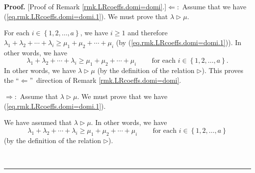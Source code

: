 \documentclass[numbers=enddot,12pt,final,onecolumn,notitlepage]{scrartcl}%
\theoremstyle{definition}
\newenvironment{proof}[1][Proof]{\noindent\textbf{#1.} }{\ \rule{0.5em}{0.5em}}
\begin{document}
\begin{proof}
[Proof of Remark \ref{rmk.LRcoeffs.domi=domi}.]$\Longleftarrow:$ Assume that
we have (\ref{eq.rmk.LRcoeffs.domi=domi.1}). We must prove that $\lambda
\triangleright\mu$.

For each $i\in\left\{  1,2,\ldots,a\right\}  $, we have $i\geq1$ and therefore
$\lambda_{1}+\lambda_{2}+\cdots+\lambda_{i}\geq\mu_{1}+\mu_{2}+\cdots+\mu_{i}$
(by (\ref{eq.rmk.LRcoeffs.domi=domi.1})). In other words, we have%
\[
\lambda_{1}+\lambda_{2}+\cdots+\lambda_{i}\geq\mu_{1}+\mu_{2}+\cdots+\mu
_{i}\ \ \ \ \ \ \ \ \ \ \text{for each }i\in\left\{  1,2,\ldots,a\right\}  .
\]
In other words, we have $\lambda\triangleright\mu$ (by the definition of the
relation $\triangleright$). This proves the \textquotedblleft$\Longleftarrow
$\textquotedblright\ direction of Remark \ref{rmk.LRcoeffs.domi=domi}.

$\Longrightarrow:$ Assume that $\lambda\triangleright\mu$. We must prove that
we have (\ref{eq.rmk.LRcoeffs.domi=domi.1}).

We have assumed that $\lambda\triangleright\mu$. In other words, we have%
\begin{equation}
\lambda_{1}+\lambda_{2}+\cdots+\lambda_{i}\geq\mu_{1}+\mu_{2}+\cdots+\mu
_{i}\ \ \ \ \ \ \ \ \ \ \text{for each }i\in\left\{  1,2,\ldots,a\right\}
\label{pf.rmk.LRcoeffs.domi=domi.1}%
\end{equation}
(by the definition of the relation $\triangleright$).


\end{proof}
\end{document}
